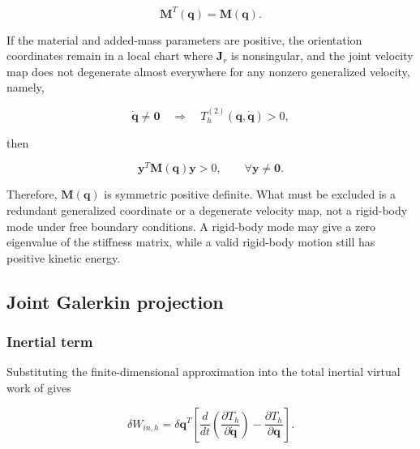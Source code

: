 \begin{equation}
\label{eq:galerkin-2-62}
\mathbf{M}^{T}\left( \mathbf{q} \right) = \mathbf{M}\left( \mathbf{q} \right).
\end{equation}

If the material and added-mass parameters are positive, the orientation coordinates remain in a local chart where \(\mathbf{J}_{r}\) is nonsingular, and the joint velocity map does not degenerate almost everywhere for any nonzero generalized velocity, namely,

\begin{equation}
\label{eq:galerkin-2-63}
\dot{\mathbf{q}} \neq \mathbf{0}\quad \Rightarrow \quad T_{h}^{(2)}\left( \mathbf{q},\dot{\mathbf{q}} \right) > 0,
\end{equation}

then

\begin{equation}
\label{eq:galerkin-2-64}
\mathbf{y}^{T}\mathbf{M}\left( \mathbf{q} \right)\mathbf{y} > 0,\quad\quad\forall\mathbf{y} \neq \mathbf{0}.
\end{equation}

Therefore, \(\mathbf{M}\left( \mathbf{q} \right)\) is symmetric positive definite. What must be excluded is a redundant generalized coordinate or a degenerate velocity map, not a rigid-body mode under free boundary conditions. A rigid-body mode may give a zero eigenvalue of the stiffness matrix, while a valid rigid-body motion still has positive kinetic energy.

\subsection{Joint Galerkin projection}\label{sec:galerkin-2-5}

\subsubsection{Inertial term}\label{sec:galerkin-2-5-1}

Substituting the finite-dimensional approximation into the total inertial virtual work of  gives

\begin{equation}
\label{eq:galerkin-2-65}
\delta W_{in,h} = \delta\mathbf{q}^{T}\left\lbrack \frac{d}{dt}\left( \frac{\partial T_{h}}{\partial\dot{\mathbf{q}}} \right) - \frac{\partial T_{h}}{\partial\mathbf{q}} \right\rbrack.
\end{equation}

